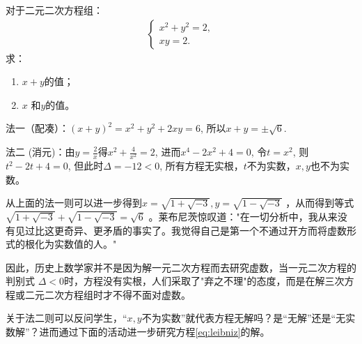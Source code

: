 \begin{activity}[莱布尼兹的方程]
    对于二元二次方程组：
    \begin{align}
        \begin{cases}
            x^2+y^2=2, \\
            xy=2.
        \end{cases}
        \label{eq:leibniz}
    \end{align}
    求：
    \begin{enumerate}
        \item $x+y$的值；
        \item $x$ 和$y$的值。
    \end{enumerate}
\end{activity}

\begin{solution}
    法一（配凑）：$(x+y)^2= x^2+y^2+2xy=6$, 所以$x+y=\pm \sqrt{6}$.

    法二 (消元)：由$y=\frac{2}{x}$得$x^2+\frac{4}{x^2}=2$, 进而$x^4-2x^2+4=0$, 令$t=x^2$, 则$t^2-2t+4=0$, 但此时$\Delta=-12<0$, 所有方程无实根，$t$不为实数，$x,y$也不为实数。
\end{solution}

\begin{note}
    从上面的法一则可以进一步得到$x=\sqrt{1+\sqrt{-3}}, y=\sqrt{1-\sqrt{-3}}$ ，从而得到等式 $\sqrt{1+\sqrt{-3}}+\sqrt{1-\sqrt{-3}}=\sqrt{6}$ 。莱布尼茨惊叹道："在一切分析中，我从来没有见过比这更奇异、更矛盾的事实了。我觉得自己是第一个不通过开方而将虚数形式的根化为实数值的人。"

    因此，历史上数学家并不是因为解一元二次方程而去研究虚数，当一元二次方程的判别式 $\Delta<0$时，方程没有实根，人们采取了"弃之不理"的态度，而是在解三次方程或二元二次方程组时才不得不面对虚数。

    关于法二则可以反问学生，“$x,y$不为实数”就代表方程无解吗？是“无解”还是“无实数解”？进而通过下面的活动进一步研究方程\eqref{eq:leibniz}的解。
\end{note}

